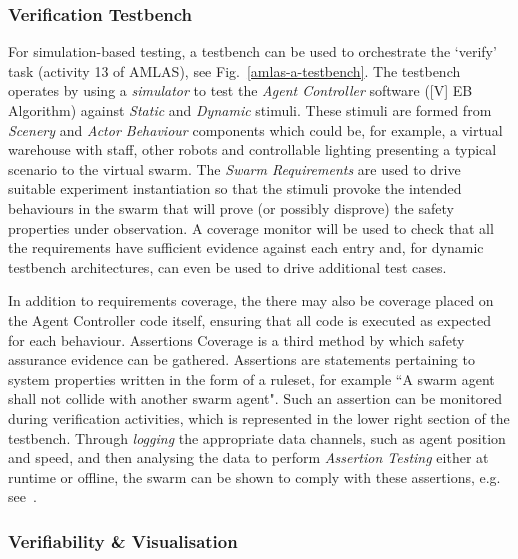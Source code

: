 \documentclass[lettersize,journal]{IEEEtran}
\begin{document}
\subsubsection*{Verification Testbench}

For simulation-based testing, a testbench can be used to orchestrate the `verify' task (activity 13 of AMLAS), see Fig.~\ref{amlas-a-testbench}. The testbench operates by using a \emph{simulator} to test the \emph{Agent Controller} software ([V] EB Algorithm) against \emph{Static} and \emph{Dynamic} stimuli. These stimuli are formed from \emph{Scenery} and \emph{Actor Behaviour} components which could be, for example, a virtual warehouse with staff, other robots and controllable lighting presenting a typical scenario to the virtual swarm. The \emph{Swarm Requirements} are used to drive suitable experiment instantiation so that the stimuli provoke the intended behaviours in the swarm that will prove (or possibly disprove) the safety properties under observation. A coverage monitor will be used to check that all the requirements have sufficient evidence against each entry and, for dynamic testbench architectures, can even be used to drive additional test cases. 

In addition to requirements coverage, the there may also be coverage placed on the Agent Controller code itself, ensuring that all code is executed as expected for each behaviour. Assertions Coverage is a third method by which safety assurance evidence can be gathered. Assertions are statements pertaining to system properties written in the form of a ruleset, for example ``A swarm agent shall not collide with another swarm agent". Such an assertion can be monitored during verification activities, which is represented in the lower right section of the testbench. Through \emph{logging} the appropriate data channels, such as agent position and speed, and then analysing the data to perform \emph{Assertion Testing} either at runtime or offline, the swarm can be shown to comply with these assertions, e.g. see~\cite{harper2021safety}. \\



\subsubsection*{Verifiability \& Visualisation}

\end{document}
